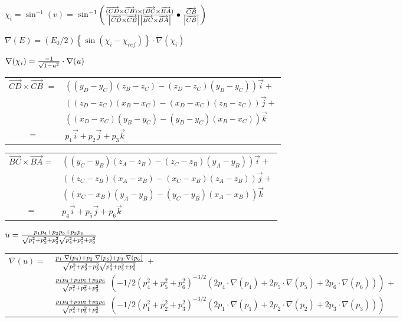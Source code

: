 $\chi _{i}=\sin ^{-1}(v)=$ $\sin ^{-1}\left( \frac{\overrightarrow{(CD}%
\times \overrightarrow{CB})\times (\overrightarrow{BC}\times \overrightarrow{%
BA})}{\left| \overrightarrow{CD}\times \overrightarrow{CB}\right| \left| 
\overrightarrow{BC}\times \overrightarrow{BA}\right| }\bullet \frac{%
\overrightarrow{CB}}{\left| \overrightarrow{CB}\right| }\right) $

$\nabla (E)=(E_{0}/2)\left\{ \sin \left( \chi _{i}-\chi _{ref}\right)
\right\} \cdot \nabla (\chi _{i})$

$\nabla (\chi _{i})=\frac{-1}{\sqrt{1-u^{2}}}\cdot \nabla (u)\smallskip
\medskip $

\begin{tabular}{ll}
$\overrightarrow{CD}\times \overrightarrow{CB}$ $=$ & $%
((y_{D}-y_{C})(z_{B}-z_{C})-(z_{D}-z_{C})(y_{B}-y_{C}))\overrightarrow{i}+$
\\ 
& $((z_{D}-z_{C})(x_{B}-x_{C})-(x_{D}-x_{C})(z_{B}-z_{C}))\overrightarrow{j}+
$ \\ 
& $((x_{D}-x_{C})(y_{B}-y_{C})-(y_{D}-y_{C})(x_{B}-x_{C}))\overrightarrow{k}$
\\ 
\multicolumn{1}{c}{$=$} & $p_{1}\overrightarrow{i}+p_{2}\overrightarrow{j}%
+p_{3}\overrightarrow{k}$%
\end{tabular}
\medskip \medskip 

\begin{tabular}{ll}
$\overrightarrow{BC}\times \overrightarrow{BA}=$ & $%
((y_{C}-y_{B})(z_{A}-z_{B})-(z_{C}-z_{B})(y_{A}-y_{B}))\overrightarrow{i}+$
\\ 
& $((z_{C}-z_{B})(x_{A}-x_{B})-(x_{C}-x_{B})(z_{A}-z_{B}))\overrightarrow{j}+
$ \\ 
& $((x_{C}-x_{B})(y_{A}-y_{B})-(y_{C}-y_{B})(x_{A}-x_{B}))\overrightarrow{k}$
\\ 
\multicolumn{1}{c}{$=$} & $p_{4}\overrightarrow{i}+p_{5}\overrightarrow{j}
+p_{6}\overrightarrow{k}$%
\end{tabular}
\medskip \medskip 

$u=\frac{p_{1}p_{4}+p_{2}p_{5}+p_{3}p_{6}}{\sqrt{%
p_{1}^{2}+p_{2}^{2}+p_{3}^{2}}\sqrt{p_{4}^{2}+p_{5}^{2}+p_{6}^{2}}}\medskip
\medskip $

\begin{tabular}{ll}
$\nabla (u)=$ & $\frac{p_{1}\cdot \nabla (p_{4})+p_{2}\cdot \nabla
(p_{5})+p_{3}\cdot \nabla (p_{6})}{\sqrt{p_{1}^{2}+p_{2}^{2}+p_{3}^{2}}\sqrt{%
p_{4}^{2}+p_{5}^{2}+p_{6}^{2}}}$ $+$ \\ 
& $\frac{p_{1}p_{4}+p_{2}p_{5}+p_{3}p_{6}}{\sqrt{%
p_{1}^{2}+p_{2}^{2}+p_{3}^{2}}}$ $\left( -1/2\left(
p_{4}^{2}+p_{5}^{2}+p_{6}^{2}\right) ^{-3/2}\left( 2p_{4}\cdot \nabla
(p_{4})+2p_{5}\cdot \nabla (p_{5})+2p_{6}\cdot \nabla (p_{6})\right) \right) 
$ $+$ \\ 
& $\frac{p_{1}p_{4}+p_{2}p_{5}+p_{3}p_{6}}{\sqrt{%
p_{4}^{2}+p_{5}^{2}+p_{6}^{2}}}$ $\left( -1/2\left(
p_{1}^{2}+p_{2}^{2}+p_{3}^{2}\right) ^{-3/2}\left( 2p_{1}\cdot \nabla
(p_{1})+2p_{2}\cdot \nabla (p_{2})+2p_{3}\cdot \nabla (p_{3})\right) \right) 
$%
\end{tabular}
\pagebreak 

